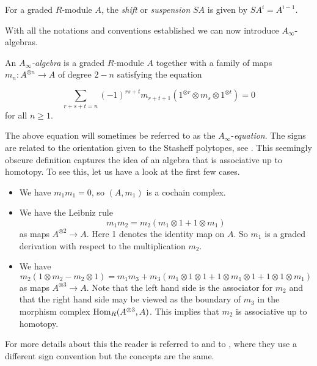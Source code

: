 \documentclass[Thesis.tex]{subfiles}
\begin{document}
\begin{defin}
For a graded $R$-module $A$, the \emph{shift} or \emph{suspension} $SA$ is given by $SA^i=A^{i-1}$. %
\end{defin}
\pagebreak
With all the notations and conventions established we can now introduce $A_\infty$-algebras. 

\begin{defin}\label{ainftyalgebra}
An \emph{$A_\infty$-algebra} is a graded $R$-module $A$ together with a family of maps $m_n:A^{\otimes n}\to A$ of degree $2-n$ satisfying the equation

\begin{equation}\label{ainftyequation}
\sum_{r+s+t=n}(-1)^{rs+t}m_{r+t+1}(1^{\otimes r}\otimes m_s\otimes 1^{\otimes t})=0
\end{equation}
for all $n\geq 1$.
\end{defin}
The above equation will sometimes be referred to as the $A_\infty$-\emph{equation}. The signs are related to the orientation given to the Stasheff polytopes, see . This seemingly obscure definition captures the idea of an algebra that is associative up to homotopy. To see this, let us have a look at the first few cases.

\begin{itemize}
\item We have $m_1m_1=0$, so $(A, m_1)$ is a cochain complex.
\item We have the Leibniz rule
\[
m_1 m_2 = m_2 (m_1 \otimes 1 + 1 \otimes m_1)
\]
as maps $A^{\otimes 2}\to A$. Here 1 denotes the identity map on $A$. So $m_1$ is
a graded derivation with respect to the multiplication $m_2$.
\item We have
\[
m_2(1\otimes m_2 − m_2\otimes 1)= m_1m_3 + m_3 (m_1\otimes 1\otimes 1 + 1\otimes m_1\otimes 1 + 1\otimes 1\otimes m_1)
\]
as maps $A^{\otimes 3}\to A$. Note that the left hand side is the associator for $m_2$ and
that the right hand side may be viewed as the boundary of $m_3$ in the morphism
complex $\operatorname{Hom}_R (A^{\otimes 3},A)$. This implies that $m_2$ is associative up to homotopy. 
\end{itemize}


 For more details about this the reader is referred to \cite{keller} and to \cite[\S 9.2]{lodayvallette}, where they use a different sign convention but the concepts are the same.
\end{document}
